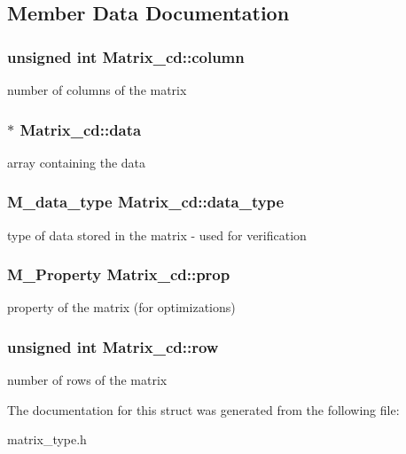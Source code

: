 \subsection{Member Data Documentation}
\subsubsection[{\texorpdfstring{column}{column}}]{\setlength{\rightskip}{0pt plus 5cm}unsigned int Matrix\+\_\+cd\+::column}\hypertarget{structMatrix__cd_a4b92706967cff4acd04999c4fc2ba8d6}{}\label{structMatrix__cd_a4b92706967cff4acd04999c4fc2ba8d6}
number of columns of the matrix 
\subsubsection[{\texorpdfstring{data}{data}}]{$\ast$ Matrix\+\_\+cd\+::data}\hypertarget{structMatrix__cd_ad754acb46b524029b61d1894c65aeace}{}\label{structMatrix__cd_ad754acb46b524029b61d1894c65aeace}
array containing the data 
\subsubsection[{\texorpdfstring{data\+\_\+type}{data_type}}]{\setlength{\rightskip}{0pt plus 5cm}M\+\_\+data\+\_\+type Matrix\+\_\+cd\+::data\+\_\+type}\hypertarget{structMatrix__cd_a258625d86cd44986cb352e84b7d5509d}{}\label{structMatrix__cd_a258625d86cd44986cb352e84b7d5509d}
type of data stored in the matrix -\/ used for verification 
\subsubsection[{\texorpdfstring{prop}{prop}}]{\setlength{\rightskip}{0pt plus 5cm}M\+\_\+\+Property Matrix\+\_\+cd\+::prop}\hypertarget{structMatrix__cd_a346b2397657fec70767d3bbdd210a129}{}\label{structMatrix__cd_a346b2397657fec70767d3bbdd210a129}
property of the matrix (for optimizations) 
\subsubsection[{\texorpdfstring{row}{row}}]{\setlength{\rightskip}{0pt plus 5cm}unsigned int Matrix\+\_\+cd\+::row}\hypertarget{structMatrix__cd_a327b0893124ef84c447dcb9d08d14403}{}\label{structMatrix__cd_a327b0893124ef84c447dcb9d08d14403}
number of rows of the matrix 

The documentation for this struct was generated from the following file\+:\begin{DoxyCompactItemize}
\item 
matrix\+\_\+type.\+h\end{DoxyCompactItemize}
